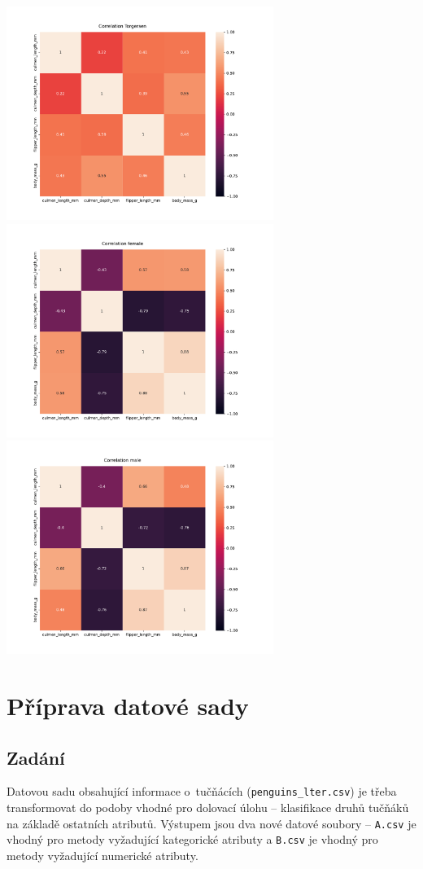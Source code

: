 \documentclass[10pt,xcolor=pdflatex,dvipsnames,table,oneside]{book}
\begin{document}
\includegraphics[width=0.65\textwidth, angle = 0]{img/torgersen-corr.pdf}
\includegraphics[width=0.65\textwidth, angle = 0]{img/female-corr.pdf}
\includegraphics[width=0.65\textwidth, angle = 0]{img/male-corr.pdf}

\chapter{Příprava datové sady}

\section{Zadání}
Datovou sadu obsahující informace o~tučňácích (\verb|penguins_lter.csv|) je třeba transformovat do podoby vhodné pro
dolovací úlohu – klasifikace druhů tučňáků na základě ostatních atributů. Výstupem jsou dva nové datové
soubory – \verb|A.csv| je vhodný pro metody vyžadující kategorické atributy a \verb|B.csv| je vhodný pro metody
vyžadující numerické atributy.
\end{document}

